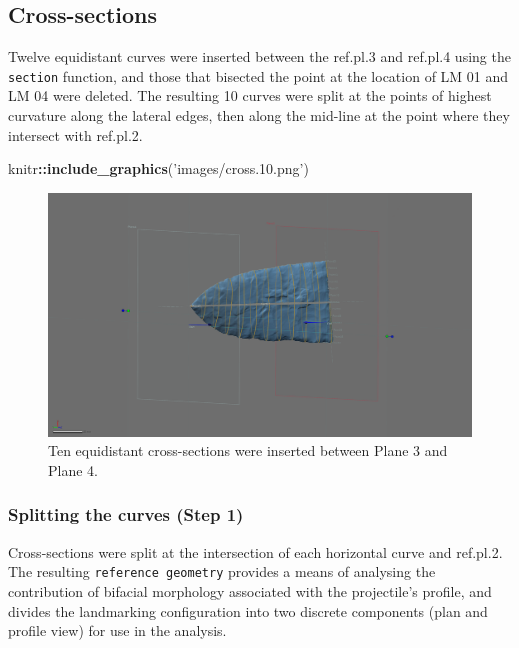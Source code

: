 \documentclass[
]{article}
\newenvironment{Shaded}{\begin{snugshade}}{\end{snugshade}}
\newcommand{\KeywordTok}[1]{\textcolor[rgb]{0.13,0.29,0.53}{\textbf{#1}}}
\newcommand{\NormalTok}[1]{#1}
\newcommand{\OperatorTok}[1]{\textcolor[rgb]{0.81,0.36,0.00}{\textbf{#1}}}
\newcommand{\StringTok}[1]{\textcolor[rgb]{0.31,0.60,0.02}{#1}}
\begin{document}
\hypertarget{cross-sections}{%
\subsection{Cross-sections}\label{cross-sections}}

Twelve equidistant curves were inserted between the ref.pl.3 and
ref.pl.4 using the \texttt{section} function, and those that bisected
the point at the location of LM 01 and LM 04 were deleted. The resulting
10 curves were split at the points of highest curvature along the
lateral edges, then along the mid-line at the point where they intersect
with ref.pl.2.

\begin{Shaded}
\begin{Highlighting}[]
\NormalTok{knitr}\OperatorTok{::}\KeywordTok{include_graphics}\NormalTok{(}\StringTok{'images/cross.10.png'}\NormalTok{)}
\end{Highlighting}
\end{Shaded}

\begin{figure}
\includegraphics[width=1\linewidth]{images/cross.10} \caption{Ten equidistant cross-sections were inserted between Plane 3 and Plane 4.}\label{fig:cross.10}
\end{figure}

\hypertarget{splitting-the-curves-step-1}{%
\subsubsection{Splitting the curves (Step
1)}\label{splitting-the-curves-step-1}}

Cross-sections were split at the intersection of each horizontal curve
and ref.pl.2. The resulting \texttt{reference\ geometry} provides a
means of analysing the contribution of bifacial morphology associated
with the projectile's profile, and divides the landmarking configuration
into two discrete components (plan and profile view) for use in the
analysis.
\end{document}
